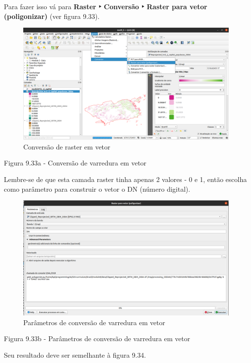 \documentclass[
]{book}
\begin{document}
Para fazer isso vá para \textbf{Raster ‣ Conversão ‣ Raster para vetor (poligonizar)} (ver figura 9.33).

\begin{figure}
\centering
\includegraphics{media/modulo9/fig933_a.png}
\caption{Conversão de raster em vetor}
\end{figure}

Figura 9.33a - Conversão de varredura em vetor

Lembre-se de que esta camada raster tinha apenas 2 valores - 0 e 1, então escolha como parâmetro para construir o vetor o DN (número digital).

\begin{figure}
\centering
\includegraphics{media/modulo9/fig933_b.png}
\caption{Parâmetros de conversão de varredura em vetor}
\end{figure}

Figura 9.33b - Parâmetros de conversão de varredura em vetor

Seu resultado deve ser semelhante à figura 9.34.
\end{document}
